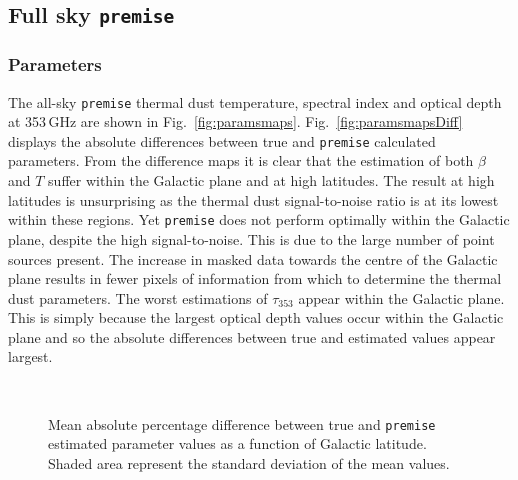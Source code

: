 \documentclass[a4paper,fleqn,usenatbib]{mnras}
\begin{document}
{\subsection{Full sky {\texttt{premise}}}

\subsubsection{Parameters}

The all-sky {\texttt{premise}} thermal dust temperature, spectral index and optical depth at 353\,GHz are shown in Fig.~\ref{fig:paramsmaps}. Fig.~\ref{fig:paramsmapsDiff} displays the absolute differences between true and {\texttt{premise}} calculated parameters. From the difference maps it is clear that the estimation of both $\beta$ and $T$ suffer within the Galactic plane and at high latitudes. The result at high latitudes is unsurprising as the thermal dust signal-to-noise ratio is at its lowest within these regions. Yet {\texttt{premise}} does not perform optimally within the Galactic plane, despite the high signal-to-noise. This is due to the large number of point sources present. The increase in masked data towards the centre of the Galactic plane results in fewer pixels of information from which to determine the thermal dust parameters. The worst estimations of $\tau_{353}$ appear within the Galactic plane. This is simply because the largest optical depth values occur within the Galactic plane and so the absolute differences between true and estimated values appear largest.  

\begin{figure}
\centering
{}\,
\caption{Mean absolute percentage difference between true and {\texttt{premise}} estimated parameter values as a function of Galactic latitude. Shaded area represent the standard deviation of the mean values.}
\label{fig:lats}
\end{figure}

}
\end{document}
